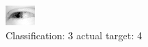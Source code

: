 \begin{figure}[h!]
\begin{center}
\includegraphics[width=0.60\columnwidth]{figures/ID2523_class_3_target_4.png}
\end{center}
\caption{ Classification: 3 actual target: 4}
\label{fig:ID2523_class_3_target_4}
\end{figure}
